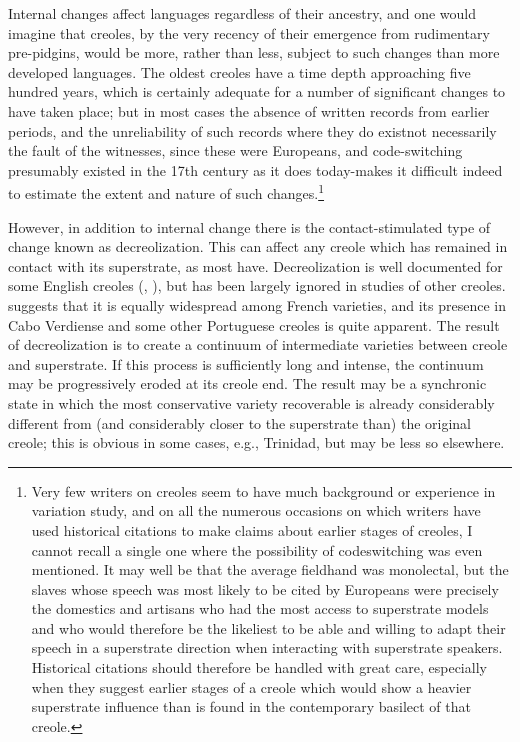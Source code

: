 Internal changes affect languages regardless of their ancestry, and one would imagine that creoles, by the very recency of their emergence from rudimentary pre-pidgins, would be more, rather than less, subject to such changes than more developed languages. The oldest creoles have a time depth approaching five hundred years, which is certainly adequate for a number of significant changes to have taken place; but in most cases the absence of written records from earlier periods, and the unreliability of such records where they do exist\-not necessarily the fault of the witnesses, since these were Europeans, and code-switching presumably existed in the 17th century as it does today-makes it difficult indeed to estimate the extent and nature of such changes.\footnote{Very few writers on creoles seem to have much background or experience in variation study, and on all the numerous occasions on which writers have used historical citations to make claims about earlier stages of creoles, I cannot recall a single one where the possi\-bility of codeswitching was even mentioned. It may well be that the average fieldhand was monolectal, but the slaves whose speech was most likely to be cited by Europeans were precisely the domestics and artisans who had the most access to superstrate models and who would therefore be the likeliest to be able and willing to adapt their speech in a superstrate direction when interacting with superstrate speakers. Historical citations should therefore be handled with great care, especially when they suggest earlier stages of a creole which would show a heavier superstrate influence than is found in the con\-temporary basilect of that creole.}

However, in addition to internal change there is the contact-stimulated type of change known as decreolization. This can affect any creole which has remained in contact with its superstrate, as most have. Decreolization is well documented for some English creoles
(\citealt{DeCamp1971}, \citealt{Bickerton1973a,Bickerton1975}), but has been largely ignored in studies of other creoles. \citet{Valdman1973} suggests that it is equally widespread among French varieties, and its presence in Cabo Verdiense and some other Portuguese creoles is quite apparent. The result of decreolization is to create a continuum of intermediate varieties be\-tween creole and superstrate. If this process is sufficiently long and intense, the continuum may be progressively eroded at its creole end. The result may be a synchronic state in which the most conservative variety recoverable is already considerably different from (and con\-siderably closer to the superstrate than) the original creole; this is obvious in some cases, e.g., Trinidad, but may be less so elsewhere.

